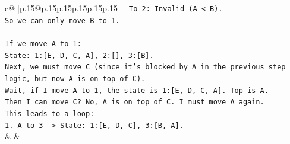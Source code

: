 \documentclass{article}
\begin{document}
{\begin{supertabular}{c@{$\;$}|p{.15\linewidth}@{}p{.15\linewidth}p{.15\linewidth}p{.15\linewidth}p{.15\linewidth}p{.15\linewidth}}
{{{\texttt{{-} To 2: Invalid (A < B).} \\
\texttt{So we can only move B to 1.} \\
\\ 
\texttt{If we move A to 1:} \\
\texttt{State: 1:{[}E, D, C, A{]}, 2:{[}{]}, 3:{[}B{]}.} \\
\texttt{Next, we must move C (since it's blocked by A in the previous step logic, but now A is on top of C).} \\
\texttt{Wait, if I move A to 1, the state is 1:{[}E, D, C, A{]}. Top is A.} \\
\texttt{Then I can move C? No, A is on top of C. I must move A again.} \\
\texttt{This leads to a loop:} \\
\texttt{1. A to 3 {-}> State: 1:{[}E, D, C{]}, 3:{[}B, A{]}.} \\
            }
        }
    }
    & & \\ \\


\end{supertabular}}
\end{document}
